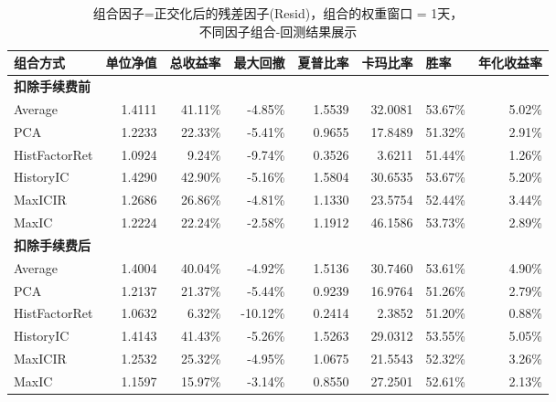 \documentclass[11pt]{article}
\begin{document}
\begin{table}[htbp]
  \centering
  \captionsetup{justification=centering}
    \caption{组合因子=正交化后的残差因子(Resid)，组合的权重窗口 = 1天，\\不同因子组合-回测结果展示}
    \label{tab: comb-backtest}
    \begin{tabular}{lrrrrrrr}
    \toprule
    组合方式  & \multicolumn{1}{l}{单位净值} & \multicolumn{1}{l}{总收益率} & \multicolumn{1}{l}{最大回撤} & \multicolumn{1}{l}{夏普比率} & \multicolumn{1}{l}{卡玛比率} & \multicolumn{1}{l}{胜率} & \multicolumn{1}{l}{年化收益率} \\
    \midrule
    \textbf{扣除手续费前} &       &       &       &       &       &       &  \\
    Average & 1.4111  & 41.11\% & -4.85\% & 1.5539  & 32.0081  & 53.67\% & 5.02\% \\
    PCA   & 1.2233  & 22.33\% & -5.41\% & 0.9655  & 17.8489  & 51.32\% & 2.91\% \\
    HistFactorRet & 1.0924  & 9.24\% & -9.74\% & 0.3526  & 3.6211  & 51.44\% & 1.26\% \\
    \rowcolor[rgb]{ .851,  .851,  .851} HistoryIC & 1.4290  & 42.90\% & -5.16\% & 1.5804  & 30.6535  & 53.67\% & 5.20\% \\
    MaxICIR & 1.2686  & 26.86\% & -4.81\% & 1.1330  & 23.5754  & 52.44\% & 3.44\% \\
    MaxIC & 1.2224  & 22.24\% & -2.58\% & 1.1912  & 46.1586  & 53.73\% & 2.89\%\\
    \hline
    \textbf{扣除手续费后} &       &       &       &       &       &       &  \\
    Average & 1.4004  & 40.04\% & -4.92\% & 1.5136  & 30.7460  & 53.61\% & 4.90\% \\
    PCA   & 1.2137  & 21.37\% & -5.44\% & 0.9239  & 16.9764  & 51.26\% & 2.79\% \\
    HistFactorRet & 1.0632  & 6.32\% & -10.12\% & 0.2414  & 2.3852  & 51.20\% & 0.88\% \\
    \rowcolor[rgb]{ .851,  .851,  .851} HistoryIC & 1.4143  & 41.43\% & -5.26\% & 1.5263  & 29.0312  & 53.55\% & 5.05\% \\
    MaxICIR & 1.2532  & 25.32\% & -4.95\% & 1.0675  & 21.5543  & 52.32\% & 3.26\% \\
    MaxIC & 1.1597  & 15.97\% & -3.14\% & 0.8550  & 27.2501  & 52.61\% & 2.13\% \\
    \bottomrule
    \end{tabular}%
  \label{tab:Resid1D}%
\end{table}
\end{document}
